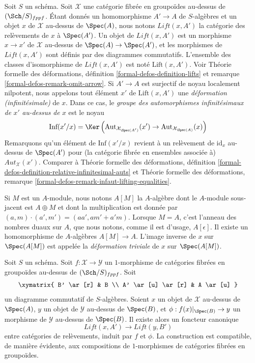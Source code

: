 \medskip\noindent
Soit $S$ un schéma. Soit $\mathcal{X}$ une catégorie fibrée en groupoïdes
au-dessus de $(\Sch/S)_{fppf}$. Étant donnés un homomorphisme $A' \to A$ de $S$-algèbres
et un objet $x$ de $\mathcal{X}$ au-dessus de $\Spec(A)$, nous notons
$\textit{Lift}(x, A')$ la catégorie des relèvements de $x$ à $\Spec(A')$.
Un objet de $\textit{Lift}(x, A')$ est un morphisme $x \to x'$ de $\mathcal{X}$
au-dessus de $\Spec(A) \to \Spec(A')$, et les morphismes de $\textit{Lift}(x, A')$
sont définis par des diagrammes commutatifs. L'ensemble des classes d'isomorphisme de
$\textit{Lift}(x, A')$ est noté $\text{Lift}(x, A')$. Voir
Théorie formelle des déformations, définition \ref{formal-defos-definition-lifts} et
remarque \ref{formal-defos-remark-omit-arrow}.
Si $A' \to A$ est surjectif de noyau localement nilpotent, nous appelons tout élément
$x'$ de $\text{Lift}(x, A')$ une {\it déformation (infinitésimale)} de $x$.
Dans ce cas, le {\it groupe des automorphismes infinitésimaux de $x'$ au-dessus de $x$}
est le noyau
$$
\text{Inf}(x'/x) =
\Ker\left(
\text{Aut}_{\mathcal{X}_{\Spec(A')}}(x') \to
\text{Aut}_{\mathcal{X}_{\Spec(A)}}(x)\right)
$$
Remarquons qu'un élément de $\text{Inf}(x'/x)$ revient à un relèvement
de $\text{id}_x$ au-dessus de $\Spec(A')$ pour (la catégorie fibrée en ensembles associée
à) $\mathit{Aut}_\mathcal{X}(x')$. Comparer à
Théorie formelle des déformations, définition
\ref{formal-defos-definition-relative-infinitesimal-auts} et
Théorie formelle des déformations, remarque
\ref{formal-defos-remark-infaut-lifting-equalities}.

\medskip\noindent
Si $M$ est un $A$-module, nous notons $A[M]$ la $A$-algèbre dont le
$A$-module sous-jacent est $A \oplus M$ et dont la multiplication est donnée par
$(a, m) \cdot (a', m') = (aa', am' + a'm)$. Lorsque $M = A$, c'est l'anneau
des nombres duaux sur $A$, que nous notons, comme il est d'usage, $A[\epsilon]$.
Il existe un homomorphisme de $A$-algèbres $A[M] \to A$. L'image inverse de $x$ sur $\Spec(A[M])$
est appelée la {\it déformation triviale} de $x$ sur $\Spec(A[M])$.

\begin{lemma}
\label{lemma-functoriality}
Soit $S$ un schéma. Soit $f : \mathcal{X} \to \mathcal{Y}$ un $1$-morphisme
de catégories fibrées en groupoïdes au-dessus de $(\Sch/S)_{fppf}$. Soit
$$
\xymatrix{
B' \ar[r] & B \\
A' \ar[u] \ar[r] & A \ar[u]
}
$$
un diagramme commutatif de $S$-algèbres. Soient $x$ un objet de $\mathcal{X}$
au-dessus de $\Spec(A)$, $y$ un objet de $\mathcal{Y}$ au-dessus de $\Spec(B)$,
et $\phi : f(x)|_{\Spec(B)} \to y$ un morphisme de $\mathcal{Y}$
au-dessus de $\Spec(B)$. Il existe alors un foncteur canonique
$$
\textit{Lift}(x, A') \longrightarrow \textit{Lift}(y, B')
$$
entre catégories de relèvements, induit par $f$ et $\phi$. La construction est
compatible, de manière évidente, aux compositions de $1$-morphismes de catégories fibrées en
groupoïdes.
\end{lemma}

